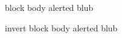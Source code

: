 \documentclass{beamer}
\begin{document}
    \begin{frame}

\begin{beamercolorbox}[center,wd=\paperwidth]{block body alerted}
    blub
\end{beamercolorbox}

\begin{beamercolorbox}[center,wd=\paperwidth]{invert block body alerted}
    blub
\end{beamercolorbox}        

    \end{frame}
\end{document}
